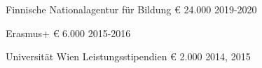 \begin{cvhonors}

  \cvhonor
    {Finnische Nationalagentur für Bildung} %
    {} %
    {€ 24.000} %
    {2019-2020} %
    
  \cvhonor
    {Erasmus+} %
    {} %
    {€ 6.000} %
    {2015-2016} %

  \cvhonor
    {Universität Wien} %
    {Leistungsstipendien} %
    {€ 2.000} %
    {2014, 2015} %
\end{cvhonors}
